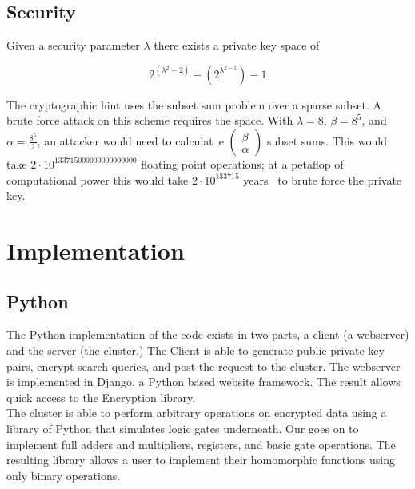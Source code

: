 \documentclass[letterpaper,11pt]{article} %
\begin{document}
\subsection*{Security}
Given a security parameter \(\lambda\) there exists a private key space of

\[2^{(\lambda^2-2)} - (2^{\lambda^{2-1}})-1\]

The cryptographic hint uses the subset sum problem over a sparse subset. A brute force attack on this scheme requires the space. With \(\lambda = 8\), \(\beta  = 8^5\), and \(\alpha = \frac{8^5}{2}\), an attacker would need to calculat\
e \(\left(\begin{matrix}\beta\\\alpha\end{matrix}\right)\) subset sums. This would take \(2\cdot 10^{133715000000000000000}\) floating point operations; at a petaflop of computational power this would take \(2\cdot 10^{133715}\) years \
to brute force the private key.



\section*{Implementation}
\subsection*{Python}
The Python implementation of the code exists in two parts, a client (a webserver) and the server (the cluster.) The Client is able to generate public private key pairs, encrypt search queries, and post the request to the cluster. The webserver is implemented in Django, a Python based website framework. The result allows quick access to the Encryption library.\\

The cluster is able to perform arbitrary operations on encrypted data using a library of Python that simulates logic gates underneath. Our goes on to implement full adders and multipliers, registers, and basic gate operations. The resulting library allows a user to implement their homomorphic functions using only binary operations.\\
\end{document}

